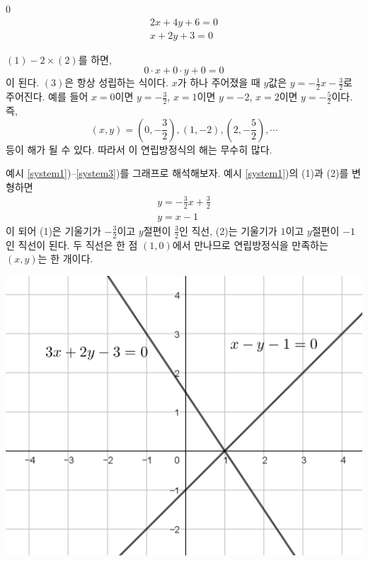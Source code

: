 \documentclass{oblivoir}
\begin{document}
%
\exam{}\label{system3}
\setcounter{equation}0
\begin{align}
2x+4y+6=0\\
x+2y+3=0
\end{align}

\((1)-2\times(2)\)를 하면,
\begin{equation}
0\cdot x+0\cdot y+0=0
\end{equation}
이 된다.
\((3)\)은 항상 성립하는 식이다.
\(x\)가 하나 주어졌을 때 \(y\)값은 \(y=-\frac12x-\frac32\)로 주어진다.
예를 들어 \(x=0\)이면 \(y=-\frac32\), \(x=1\)이면 \(y=-2\), \(x=2\)이면 \(y=-\frac52\)이다.
즉,
\[(x,y)=\left(0,-\frac32\right),\left(1,-2\right),\left(2,-\frac52\right),\cdots\]
등이 해가 될 수 있다.
따라서 이 연립방정식의 해는 무수히 많다.

\clearpage

%
\rema{}
예시 \ref{system1})--\ref{system3})를 그래프로 해석해보자.
예시 \ref{system1})의 (1)과 (2)를 변형하면
\begin{align*}
y=-\frac32x+\frac32\\
y=x-1
\end{align*}
이 되어
(1)은 기울기가 \(-\frac32\)이고 \(y\)절편이 \(\frac32\)인 직선,
(2)는 기울기가 \(1\)이고 \(y\)절편이 \(-1\)인 직선이 된다.
두 직선은 한 점 \((1,0)\)에서 만나므로 연립방정식을 만족하는 \((x,y)\)는 한 개이다.

\begin{center}
\includegraphics{system_examples_01}
\end{center}
\end{document}
